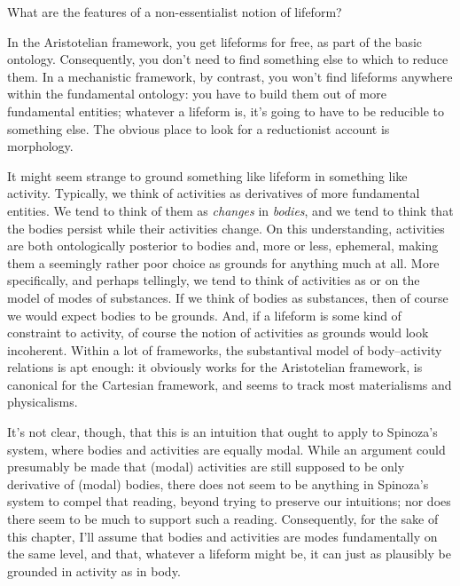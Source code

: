 \documentclass{article}
\newcommand{\dash}{\unskip{—}}
\begin{document}
What are the features of a non-essentialist notion of lifeform?

In the Aristotelian framework, you get lifeforms for free, as part of the basic ontology. Consequently, you don't need to find something else to which to reduce them. In a mechanistic framework, by contrast, you won't find lifeforms anywhere within the fundamental ontology: you have to build them out of more fundamental entities; whatever a lifeform is, it's going to have to be reducible to something else. The obvious place to look for a reductionist account is morphology.

It might seem strange to ground something like lifeform in something like activity. Typically, we think of activities as derivatives of more fundamental entities. We tend to think of them as \emph{changes} in \emph{bodies}, and we tend to think that the bodies persist while their activities change. On this understanding, activities are both ontologically posterior to bodies and, more or less, ephemeral, making them a seemingly rather poor choice as grounds for anything much at all. More specifically, and perhaps tellingly, we tend to think of activities as \dash or on the model of \dash modes of substances. If we think of bodies as substances, then of course we would expect bodies to be grounds. And, if a lifeform is some kind of constraint to activity, of course the notion of activities as grounds would look incoherent. Within a lot of frameworks, the substantival model of body–activity relations is apt enough: it obviously works for the Aristotelian framework, is canonical for the Cartesian framework, and seems to track most materialisms and physicalisms.

It's not clear, though, that this is an intuition that ought to apply to Spinoza's system, where bodies and activities are equally modal. While an argument could presumably be made that (modal) activities are still supposed to be only derivative of (modal) bodies, there does not seem to be anything in Spinoza's system to compel that reading, beyond trying to preserve our intuitions; nor does there seem to be much to support such a reading. Consequently, for the sake of this chapter, I'll assume that bodies and activities are modes fundamentally on the same level, and that, whatever a lifeform might be, it can just as plausibly be grounded in activity as in body.
\end{document}
